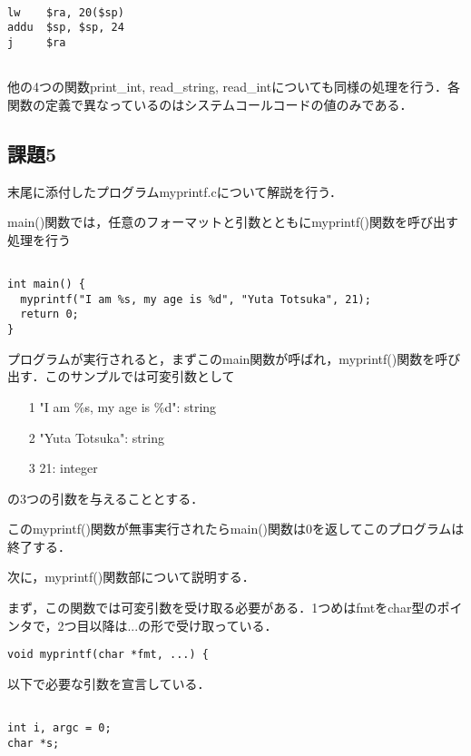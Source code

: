 \documentclass[a4j]{jarticle}
\begin{document}
{\baselineskip 3mm
  \begin{verbatim}

lw    $ra, 20($sp)
addu  $sp, $sp, 24
j     $ra


  \end{verbatim}
}

他の4つの関数print\_int, read\_string, read\_intについても同様の処理を行う．各関数の定義で異なっているのはシステムコールコードの値のみである．



\subsection{課題5}

末尾に添付したプログラムmyprintf.cについて解説を行う．

main()関数では，任意のフォーマットと引数とともにmyprintf()関数を呼び出す処理を行う

{\baselineskip 3mm
  \begin{verbatim}

int main() {
  myprintf("I am %s, my age is %d", "Yuta Totsuka", 21);
  return 0;
}

\end{verbatim}
}

プログラムが実行されると，まずこのmain関数が呼ばれ，myprintf()関数を呼び出す．このサンプルでは可変引数として

\begin{itemize}
\item[1]"I am \%s, my age is \%d": string
\item[2]"Yuta Totsuka": string
\item[3]21: integer
\end{itemize}

の3つの引数を与えることとする．

このmyprintf()関数が無事実行されたらmain()関数は0を返してこのプログラムは終了する．


次に，myprintf()関数部について説明する．

まず，この関数では可変引数を受け取る必要がある．1つめはfmtをchar型のポインタで，2つ目以降は...の形で受け取っている．

\begin{verbatim}
void myprintf(char *fmt, ...) {
\end{verbatim}

以下で必要な引数を宣言している．

{\baselineskip 3mm
  \begin{verbatim}

int i, argc = 0;
char *s;

\end{verbatim}
}
\end{document}
